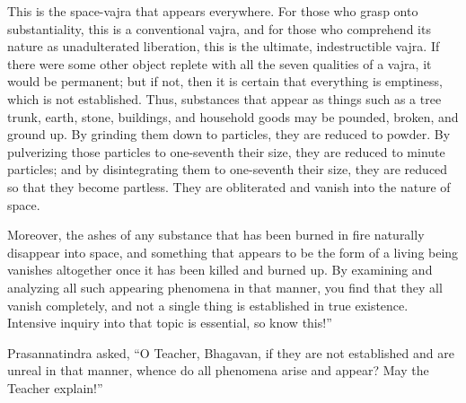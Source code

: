 \documentclass[a4paper,11pt,twoside,final]{book}
\begin{document}
This is the space-vajra that appears everywhere. For those who grasp
onto substantiality, this is a conventional vajra, and for those who
comprehend its nature as unadulterated liberation, this is the
ultimate, indestructible vajra.  If there were some other object
replete with all the seven qualities of a vajra, it would be
permanent; but if not, then it is certain that everything is
emptiness, which is not established.  Thus, substances that appear as
things such as a tree trunk, earth, stone, buildings, and household
goods may be pounded, broken, and ground up. By grinding them down to
particles, they are reduced to powder. By pulverizing those particles
to one-seventh their size, they are reduced to minute particles; and
by disintegrating them to one-seventh their size, they are reduced so
that they become partless. They are obliterated and vanish into the
nature of space.

Moreover, the ashes of any substance that has been burned in fire
naturally disappear into space, and something that appears to be the
form of a living being vanishes altogether once it has been killed and
burned up. By examining and analyzing all such appearing phenomena in
that manner, you find that they all vanish completely, and not a
single thing is established in true existence. Intensive inquiry into
that topic is essential, so know this!''

Prasannatindra asked, ``O Teacher, Bhagavan, if they are not
established and are unreal in that manner, whence do all phenomena
arise and appear? May the Teacher explain!''
\end{document}
